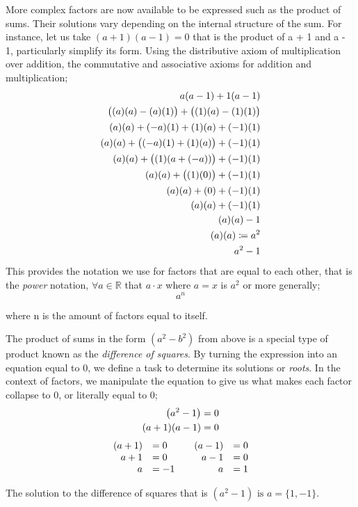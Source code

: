 \documentclass{article}
\newcommand{\paren}[1]{\mathopen{}\left( {#1}_{{}_{}}\,\negthickspace\right)\mathclose{}} %
\begin{document}
More complex factors are now available to be expressed such as the product of sums. Their solutions vary
depending on the internal structure of the sum. For instance, let us take \( (a+1)(a-1) = 0\) that is
the product of a + 1 and a - 1, particularly simplify its form. Using the
distributive axiom of multiplication over addition, the commutative and associative
axioms for addition and multiplication; 
\begin{align*}
    a\paren{a-1} + 1\paren{a-1} \\
    \paren{\paren{a}\paren{a} - \paren{a}\paren{1}} + \paren{\paren{1}\paren{a} - \paren{1}\paren{1}} \\
    (a)(a) + (-a)(1) + (1)(a) + (-1)(1) \\ 
    (a)(a) + \paren{(-a)(1) + (1)(a)} + (-1)(1) \\ 
    (a)(a) + \paren{(1)(a + (-a))} + (-1)(1) \\ 
    (a)(a) + \paren{(1)(0)} + (-1)(1) \\ 
    (a)(a) + (0) + (-1)(1) \\
    (a)(a) + (-1)(1) \\
    (a)(a) -1 \\ 
    (a)(a) \coloneqq a^2 \\
     a^2 - 1  
\end{align*}
This provides the notation we use for factors that are equal to each other, that is 
the \emph{power} notation, \(\forall a \in \mathbb{R}\) that \(a \cdot x\) where 
\(a = x\) is \(a^2\) or more generally;
\[
    a^n
\]
\begin{center}
    where n is the amount of factors equal to itself.
\end{center}

The product of sums in the form \((a^2 - b^2)\) from above is a special type of product 
known as the \emph{difference of squares}. By turning the expression into an equation equal to
0, we define a task to determine its solutions or \emph{roots}. In the context of factors, we manipulate 
the equation to give us what makes each factor collapse to 0, or literally equal to 0;
\begin{align*}
    \paren{a^2 - 1} &= 0 \\ 
    \paren{a+1} \paren{a-1} &= 0 
\end{align*}
\[
\begin{array}{rl@{\qquad}rl}
    \paren{a+1} &= 0 & \paren{a-1} &= 0 \\
    a + 1 &= 0 & a - 1 &= 0 \\ 
    a &= -1 & a &= 1 
\end{array}
\]
\begin{center}
    The solution to the difference of squares that is \((a^2-1) \text{ is } a =\{1, -1\}\). 
\end{center}
\end{document}
